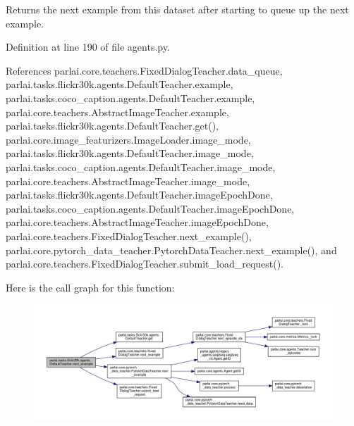 \begin{DoxyVerb}Returns the next example from this dataset after starting to queue
up the next example.
\end{DoxyVerb}
 

Definition at line 190 of file agents.\+py.



References parlai.\+core.\+teachers.\+Fixed\+Dialog\+Teacher.\+data\+\_\+queue, parlai.\+tasks.\+flickr30k.\+agents.\+Default\+Teacher.\+example, parlai.\+tasks.\+coco\+\_\+caption.\+agents.\+Default\+Teacher.\+example, parlai.\+core.\+teachers.\+Abstract\+Image\+Teacher.\+example, parlai.\+tasks.\+flickr30k.\+agents.\+Default\+Teacher.\+get(), parlai.\+core.\+image\+\_\+featurizers.\+Image\+Loader.\+image\+\_\+mode, parlai.\+tasks.\+flickr30k.\+agents.\+Default\+Teacher.\+image\+\_\+mode, parlai.\+tasks.\+coco\+\_\+caption.\+agents.\+Default\+Teacher.\+image\+\_\+mode, parlai.\+core.\+teachers.\+Abstract\+Image\+Teacher.\+image\+\_\+mode, parlai.\+tasks.\+flickr30k.\+agents.\+Default\+Teacher.\+image\+Epoch\+Done, parlai.\+tasks.\+coco\+\_\+caption.\+agents.\+Default\+Teacher.\+image\+Epoch\+Done, parlai.\+core.\+teachers.\+Abstract\+Image\+Teacher.\+image\+Epoch\+Done, parlai.\+core.\+teachers.\+Fixed\+Dialog\+Teacher.\+next\+\_\+example(), parlai.\+core.\+pytorch\+\_\+data\+\_\+teacher.\+Pytorch\+Data\+Teacher.\+next\+\_\+example(), and parlai.\+core.\+teachers.\+Fixed\+Dialog\+Teacher.\+submit\+\_\+load\+\_\+request().

Here is the call graph for this function\+:
\nopagebreak
\begin{figure}[H]
\begin{center}
\leavevmode
\includegraphics[width=350pt]{classparlai_1_1tasks_1_1flickr30k_1_1agents_1_1DefaultTeacher_ada88912036e5d75c2f2a5bff298b1d88_cgraph}
\end{center}
\end{figure}
\mbox{\label{classparlai_1_1tasks_1_1flickr30k_1_1agents_1_1DefaultTeacher_a0711151a8588c499abdda943b27793a8}} 
